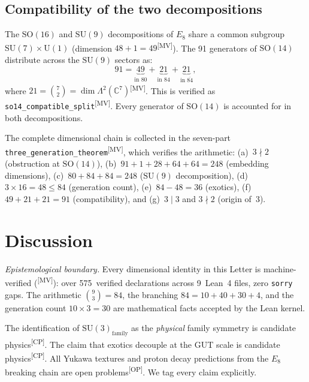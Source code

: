 \documentclass[aps,prl,twocolumn,showpacs,preprintnumbers,superscriptaddress,floatfix]{revtex4-2}
\newcommand{\MV}{\textsuperscript{[MV]}}
\newcommand{\CP}{\textsuperscript{[CP]}}
\newcommand{\OP}{\textsuperscript{[OP]}}
\begin{document}
\subsection{Compatibility of the two decompositions}

The $\mathrm{SO}(16)$ and $\mathrm{SU}(9)$ decompositions of $E_8$ share a common
subgroup $\mathrm{SU}(7) \times \mathrm{U}(1)$ (dimension
$48 + 1 = 49$\MV).  The 91 generators of $\mathrm{SO}(14)$
distribute across the $\mathrm{SU}(9)$ sectors as:
\begin{equation}
  91 = \underbrace{49}_{\text{in } 80} +
  \underbrace{21}_{\text{in } 84} +
  \underbrace{21}_{\text{in } \overline{84}},
  \label{eq:bridge}
\end{equation}
where $21 = \binom{7}{2} = \dim \Lambda^2(\mathbb{C}^7)$\MV.
This is verified as \texttt{so14\_compatible\_split}\MV.
Every generator of $\mathrm{SO}(14)$ is accounted for in
both decompositions.

The complete dimensional chain is collected in the seven-part
\texttt{three\_generation\_theorem}\MV, which verifies the arithmetic:
(a)~$3 \nmid 2$ (obstruction at $\mathrm{SO}(14)$),
(b)~$91 + 1 + 28 + 64 + 64 = 248$ (embedding dimensions),
(c)~$80 + 84 + 84 = 248$ ($\mathrm{SU}(9)$ decomposition),
(d)~$3 \times 16 = 48 \leq 84$ (generation count),
(e)~$84 - 48 = 36$ (exotics),
(f)~$49 + 21 + 21 = 91$ (compatibility), and
(g)~$3 \mid 3$ and $3 \nmid 2$ (origin of~3).

\section{Discussion}
\label{sec:discussion}

\emph{Epistemological boundary.}
Every dimensional identity in this Letter is machine-verified
(\MV): over 575~verified declarations across 9~Lean~4 files, zero \texttt{sorry}
gaps.  The arithmetic $\binom{9}{3} = 84$, the branching
$84 = 10 + 40 + 30 + 4$, and the generation count $10 \times 3 = 30$
are mathematical facts accepted by the Lean kernel.

The identification of $\mathrm{SU}(3)_\mathrm{family}$ as the
\emph{physical} family symmetry is candidate physics\CP.  The claim
that exotics decouple at the GUT scale is candidate physics\CP.
All Yukawa textures and proton decay predictions from the
$E_8$ breaking chain are open problems\OP.  We tag every claim
explicitly.
\end{document}
